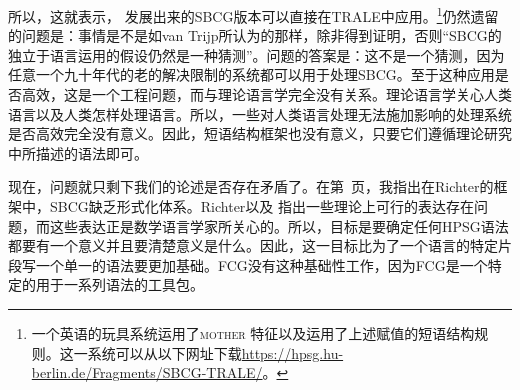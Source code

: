 所以，这就表示， \citet{Sag2012a} 发展出来的SBCG版本可以直接在TRALE中应用。\footnote{%
一个英语的玩具系统运用了\textsc{mother} 特征以及运用了上述赋值的短语结构规则。这一系统可以从以下网址下载\url{https://hpsg.hu-berlin.de/Fragments/SBCG-TRALE/}。%
}仍然遗留的问题是：事情是不是如van Trijp所认为的那样，除非得到证明，否则“SBCG的独立于语言运用的假设仍然是一种猜测”。问题的答案是：这不是一个猜测，因为任意一个九十年代的老的解决限制的系统都可以用于处理SBCG。至于这种应用是否高效，这是一个工程问题，而与理论语言学完全没有关系。理论语言学关心人类语言以及人类怎样处理语言。所以，一些对人类语言处理无法施加影响的处理系统是否高效完全没有意义。因此，短语结构框架也没有意义，只要它们遵循理论研究中所描述的语法即可。

现在，问题就只剩下我们的论述是否存在矛盾了。在第~\pageref{page-sbcg-formalization}页，我指出在Richter的框架\citep{Richter2004a-u}中，SBCG缺乏形式化体系。Richter以及 \citet{LM2006a}指出一些理论上可行的表达存在问题，而这些表达正是数学语言学家所关心的。所以，目标是要确定任何HPSG语法都要有一个意义并且要清楚意义是什么。因此，这一目标比为了一个语言的特定片段写一个单一的语法要更加基础。FCG没有这种基础性工作，因为FCG是一个特定的用于一系列语法的工具包。

